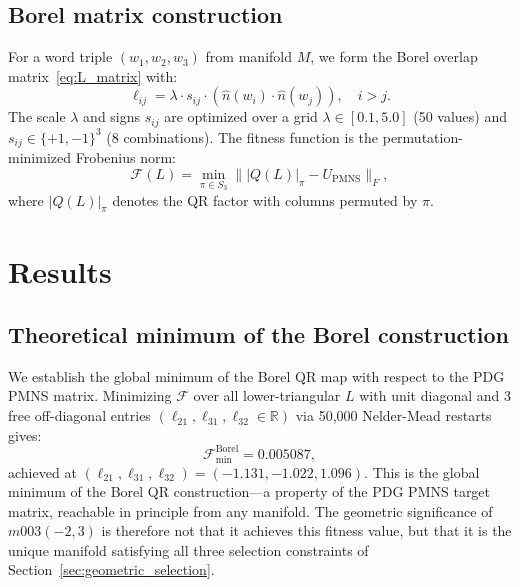 \documentclass[11pt,a4paper]{article}
\begin{document}
\subsection{Borel matrix construction}

For a word triple $(w_1, w_2, w_3)$ from manifold $M$, we form the
Borel overlap matrix~\eqref{eq:L_matrix} with:
\begin{equation}
  \ell_{ij} = \lambda \cdot s_{ij} \cdot (\hat{n}(w_i) \cdot \hat{n}(w_j)),
  \quad i > j.
\end{equation}
The scale $\lambda$ and signs $s_{ij}$ are optimized over a grid
$\lambda \in [0.1, 5.0]$ (50 values) and $s_{ij} \in \{+1,-1\}^3$ (8 combinations).
The fitness function is the permutation-minimized Frobenius norm:
\begin{equation}
\label{eq:fitness}
\mathcal{F}(L) = \min_{\pi \in S_3} \||Q(L)|_\pi - U_{\mathrm{PMNS}}\|_F,
\end{equation}
where $|Q(L)|_\pi$ denotes the QR factor with columns permuted by $\pi$.

\section{Results}
\label{sec:results}

\subsection{Theoretical minimum of the Borel construction}

We establish the global minimum of the Borel QR map with respect to
the PDG PMNS matrix. Minimizing $\mathcal{F}$ over all lower-triangular
$L$ with unit diagonal and 3 free off-diagonal entries
$(\ell_{21}, \ell_{31}, \ell_{32} \in \mathbb{R})$
via 50{,}000 Nelder-Mead restarts gives:
\begin{equation}
  \mathcal{F}_\mathrm{min}^\mathrm{Borel} = 0.005087,
\end{equation}
achieved at $(\ell_{21}, \ell_{31}, \ell_{32}) = (-1.131, -1.022, 1.096)$.
This is the global minimum of the Borel QR construction---a property
of the PDG PMNS target matrix, reachable in principle from any manifold.
The geometric significance of $m003(-2,3)$ is therefore not that it
achieves this fitness value, but that it is the unique manifold
satisfying all three selection constraints of
Section~\ref{sec:geometric_selection}.
\end{document}
